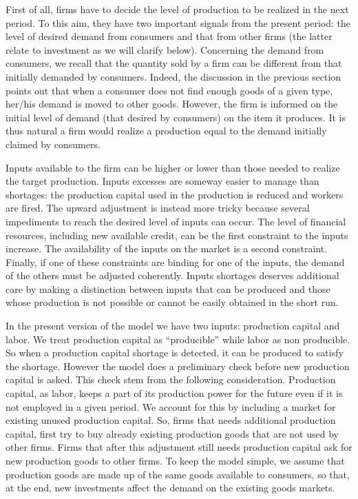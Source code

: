 \documentclass{book}
\begin{document}
First of all, firms have to decide the level of production to be realized in the next period. To this aim, they have two important signals from the present period: the level of desired demand from consumers and that from other firms (the latter relate to investment as we will clarify below).
Concerning the demand from consumers, we recall that the quantity sold by a firm can be different from that initially demanded by consumers. Indeed, the discussion in the previous section points out that when a consumer does not find enough goods of a given type, her/his demand is moved
to other goods.
However, the firm is informed on the initial level of demand (that desired by consumers) on the item it produces. It is thus natural a firm would realize a production equal to the demand initially claimed by consumers.  


Inputs available to the firm can be higher or lower than those needed to realize the target production. Inputs excesses are someway easier to manage than shortages: the production capital used in the production is reduced and workers are fired.
The upward adjustment is instead more tricky because 
several impediments to reach the desired level of inputs can occur.
The level of financial resources, including new available credit, can be the first constraint to the inputs increase. The availability of the inputs on the market is a second constraint. Finally, if one of these constraints are binding for one of the inputs, the demand of the others must be adjusted coherently. Inputs shortages deserves additional care by making a distinction between inputs that can be produced and those whose production is not possible or cannot be easily obtained in the short run. 

\label{pg:inputs2}
In the present version of the model we have two inputs: production capital and labor. We treat production capital as ``producible'' while labor as non producible. So when a production capital shortage is detected, it can be produced to satisfy the shortage. However the model does a preliminary check before new production capital is asked. This check stem from the following consideration.  
Production capital, as labor, keeps a part of its production power for the future even if it is not employed in a given period. We account for this by including a market for existing unused production capital. So, firms that needs additional production capital, first try to buy already existing production goods that are not used by other firms. Firms that after this adjustment still needs production capital ask for new production goods to other firms. To keep the model simple, we assume that production goods are made up of the same goods available to consumers, so that, at the end, new investments affect the demand on the existing goods markets.
\end{document}
